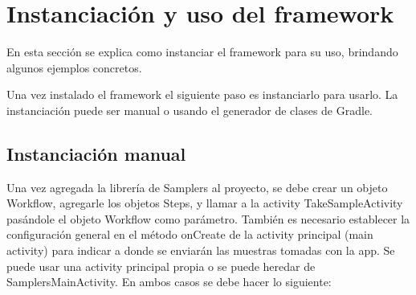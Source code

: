 \chapter{Instanciación  y uso del framework}
En esta sección se explica como instanciar el framework para su uso, brindando algunos ejemplos concretos.

Una vez instalado el framework el siguiente paso es instanciarlo para usarlo. La instanciación puede ser manual o usando el generador de clases de Gradle.


\section{Instanciación manual}
Una vez agregada la librería de Samplers al proyecto, se debe crear un objeto Workflow, agregarle los objetos Steps, y llamar a la activity TakeSampleActivity pasándole el objeto Workflow como parámetro.
También es necesario establecer la configuración general en el método onCreate de la activity principal (main activity) para indicar a donde se enviarán las muestras tomadas con la app.
Se puede usar una activity principal propia o se puede heredar de SamplersMainActivity. En ambos casos se debe hacer lo siguiente:
